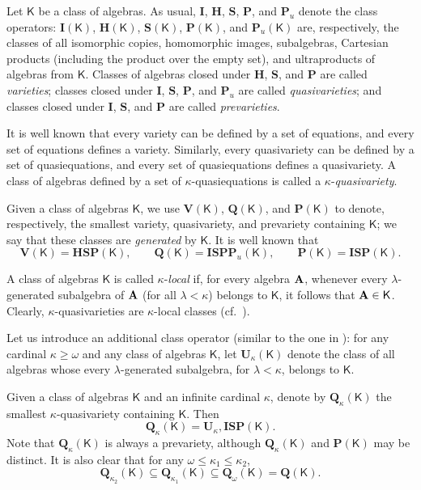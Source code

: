 \documentclass[submission,copyright,creativecommons]{eptcs}
\theoremstyle{definition}
\newcommand{\alg}[1]{{{\textbf{\upshape #1}}}}
\newcommand{\VV}{\mathbf{V}}
\newcommand{\QQ}{\mathbf{Q}}
\newcommand{\PR}{\mathbf{P}}
\newcommand{\SU}{\pmb{S}}
\newcommand{\II}{\pmb{I}}
\newcommand{\HH}{\pmb{H}}
\newcommand{\PP}{\pmb{P}}
\newcommand{\UUk}{\pmb{U}_{\!\!\kappa}}
\newcommand{\vv}[1]{\mathsf {#1}}
\newcommand{\Def}[1]{\textit{#1}}
\newcommand{\kk}{\kappa}
\newcommand{\lm}{\lambda}
\begin{document}
Let $\vv K$ be a class of algebras. As usual, $\II$, $\HH$, $\SU$, $\PP$, and $\PP_u$ denote the class operators: $\II(\vv K)$, $\HH(\vv K)$, $\SU(\vv K)$, $\PP(\vv K)$, and $\PP_u(\vv K)$ are, respectively, the classes of all isomorphic copies, homomorphic images, subalgebras, Cartesian products (including the product over the empty set), and ultraproducts of algebras from $\vv K$. Classes of algebras closed under $\HH$, $\SU$, and $\PP$ are called \Def{varieties}; classes closed under $\II$, $\SU$, $\PP$, and $\PP_u$ are called \Def{quasivarieties}; and classes closed under $\II$, $\SU$, and $\PP$ are called \Def{prevarieties}.

It is well known that every variety can be defined by a set of equations, and every set of equations defines a variety. Similarly, every quasivariety can be defined by a set of quasiequations, and every set of quasiequations defines a quasivariety. A class of algebras defined by a set of $\kk$-quasiequations is called a $\kk$-\Def{quasivariety}.

Given a class of algebras $\vv K$, we use $\VV(\vv K)$, $\QQ(\vv K)$, and $\PR(\vv K)$ to denote, respectively, the smallest variety, quasivariety, and prevariety containing $\vv K$; we say that these classes are \Def{generated} by $\vv K$. It is well known that
\[
\VV(\vv K)=\HH\SU\PP(\vv K), \qquad
\QQ(\vv K)=\II\SU\PP\PP_u(\vv K), \qquad
\PR(\vv K)=\II\SU\PP(\vv K).
\]

A class of algebras $\vv K$ is called $\kk$-\Def{local} if, for every algebra $\alg A$, whenever every $\lm$-generated subalgebra of $\alg A$ (for all $\lm < \kk$) belongs to $\vv K$, it follows that $\alg A \in \vv K$. Clearly, $\kk$-quasivarieties are $\kk$-local classes (cf.\ \cite[Section~2.3.4]{GorbunovBookE}).

\medskip

Let us introduce an additional class operator (similar to the one in \cite{BlokJonsson1999}): for any cardinal $\kappa \ge \omega$ and any class of algebras $\vv K$, let $\UUk(\vv K)$ denote the class of all algebras whose every $\lm$-generated subalgebra, for $\lm < \kk$, belongs to $\vv K$.

Given a class of algebras $\vv K$ and an infinite cardinal $\kk$, denote by $\QQ_\kk(\vv K)$ the smallest $\kk$-quasivariety containing $\vv K$. Then
\[
\QQ_\kk(\vv K) = \UUk,\II\SU\PP(\vv K).
\]
Note that $\QQ_\kk(\vv K)$ is always a prevariety, although $\QQ_\kk(\vv K)$ and $\PR(\vv K)$ may be distinct. It is also clear that for any $\omega \leq \kk_1 \leq \kk_2$,
\[
\QQ_{\kk_2}(\vv K) \subseteq \QQ_{\kk_1}(\vv K) \subseteq \QQ_\omega(\vv K) = \QQ(\vv K).
\]
\end{document}
